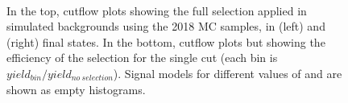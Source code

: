 \begin{figure}[h]
  \noindent
  \\
  \caption{In the top, cutflow plots showing the full selection applied in simulated backgrounds using the 2018 MC samples,
    in \eex (left) and \mmx (right) final states. In the bottom, cutflow plots but showing the
    efficiency of the selection for the single cut (each bin is $yield_{bin}/yield_{no\:selection}$).
    Signal models for different values of \mhnl and \mixpar
    are shown as empty histograms.}
  \label{fig:cutflow1}
\end{figure}

